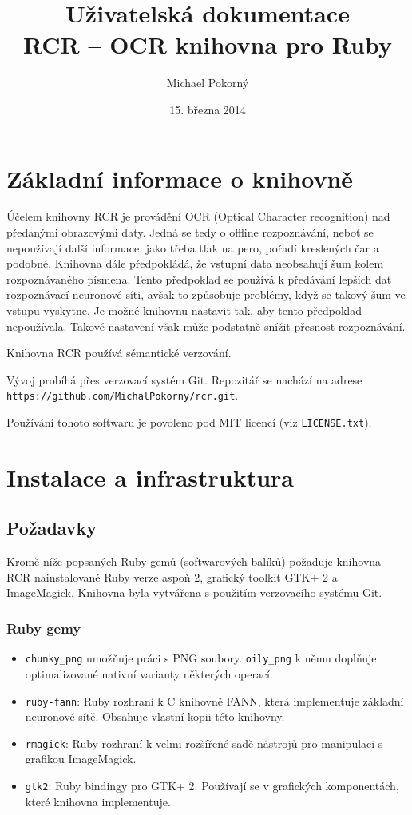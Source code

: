 \documentclass[a4paper]{article}
\def\datum{15. března 2014}
\def\githuburl{https://github.com/MichalPokorny/rcr.git}
\begin{document}
\title{Uživatelská dokumentace \\ RCR -- OCR knihovna pro Ruby}
\author{Michael Pokorný}
\date{\datum}

\maketitle

\tableofcontents

\section{Základní informace o knihovně}
Účelem knihovny RCR je provádění OCR (Optical Character recognition) nad
předanými obrazovými daty. Jedná se tedy o offline rozpoznávání, neboť
se nepoužívají další informace, jako třeba tlak na pero, pořadí kreslených
čar a podobné. Knihovna dále předpokládá, že vstupní data neobsahují
šum kolem rozpoznávaného písmena. Tento předpoklad se používá k předávání
lepších dat rozpoznávací neuronové síti, avšak to způsobuje problémy,
když se takový šum ve vstupu vyskytne. Je možné knihovnu nastavit tak, aby
tento předpoklad nepoužívala. Takové nastavení však může podstatně snížit
přesnost rozpoznávání.

Knihovna RCR používá sémantické verzování.

Vývoj probíhá přes verzovací systém Git. Repozitář se nachází
na adrese \texttt{\githuburl}.

Používání tohoto softwaru je povoleno pod MIT licencí (viz \texttt{LICENSE.txt}).

\section{Instalace a infrastruktura}
\subsection{Požadavky}
Kromě níže popsaných Ruby gemů (softwarových balíků) požaduje knihovna RCR
nainstalované Ruby verze aspoň 2, grafický toolkit GTK+ 2 a ImageMagick.
Knihovna byla vytvářena s použitím verzovacího systému Git.

\subsubsection{Ruby gemy}
\begin{itemize}
\item \texttt{chunky\_png} umožňuje práci s PNG soubory.
	\texttt{oily\_png} k němu doplňuje optimalizované nativní varianty
	některých operací.
\item \texttt{ruby-fann}: Ruby rozhraní k C knihovně FANN, která implementuje
	základní neuronové sítě. Obsahuje vlastní kopii této knihovny.
\item \texttt{rmagick}: Ruby rozhraní k velmi rozšířené sadě nástrojů pro
	manipulaci s grafikou ImageMagick.
\item \texttt{gtk2}: Ruby bindingy pro GTK+ 2. Používají se v grafických
	komponentách, které knihovna implementuje.
\end{itemize}
\end{document}
